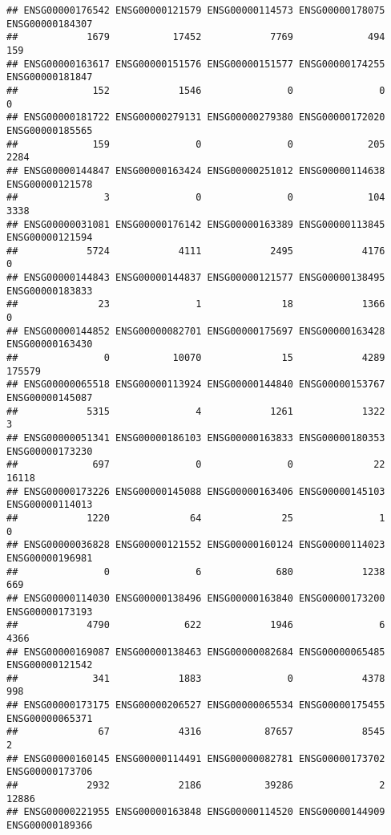 \documentclass[
]{article}
\begin{document}
\begin{verbatim}
## ENSG00000176542 ENSG00000121579 ENSG00000114573 ENSG00000178075 ENSG00000184307 
##            1679           17452            7769             494             159 
## ENSG00000163617 ENSG00000151576 ENSG00000151577 ENSG00000174255 ENSG00000181847 
##             152            1546               0               0               0 
## ENSG00000181722 ENSG00000279131 ENSG00000279380 ENSG00000172020 ENSG00000185565 
##             159               0               0             205            2284 
## ENSG00000144847 ENSG00000163424 ENSG00000251012 ENSG00000114638 ENSG00000121578 
##               3               0               0             104            3338 
## ENSG00000031081 ENSG00000176142 ENSG00000163389 ENSG00000113845 ENSG00000121594 
##            5724            4111            2495            4176               0 
## ENSG00000144843 ENSG00000144837 ENSG00000121577 ENSG00000138495 ENSG00000183833 
##              23               1              18            1366               0 
## ENSG00000144852 ENSG00000082701 ENSG00000175697 ENSG00000163428 ENSG00000163430 
##               0           10070              15            4289          175579 
## ENSG00000065518 ENSG00000113924 ENSG00000144840 ENSG00000153767 ENSG00000145087 
##            5315               4            1261            1322               3 
## ENSG00000051341 ENSG00000186103 ENSG00000163833 ENSG00000180353 ENSG00000173230 
##             697               0               0              22           16118 
## ENSG00000173226 ENSG00000145088 ENSG00000163406 ENSG00000145103 ENSG00000114013 
##            1220              64              25               1               0 
## ENSG00000036828 ENSG00000121552 ENSG00000160124 ENSG00000114023 ENSG00000196981 
##               0               6             680            1238             669 
## ENSG00000114030 ENSG00000138496 ENSG00000163840 ENSG00000173200 ENSG00000173193 
##            4790             622            1946               6            4366 
## ENSG00000169087 ENSG00000138463 ENSG00000082684 ENSG00000065485 ENSG00000121542 
##             341            1883               0            4378             998 
## ENSG00000173175 ENSG00000206527 ENSG00000065534 ENSG00000175455 ENSG00000065371 
##              67            4316           87657            8545               2 
## ENSG00000160145 ENSG00000114491 ENSG00000082781 ENSG00000173702 ENSG00000173706 
##            2932            2186           39286               2           12886 
## ENSG00000221955 ENSG00000163848 ENSG00000114520 ENSG00000144909 ENSG00000189366 

\end{verbatim}
\end{document}
